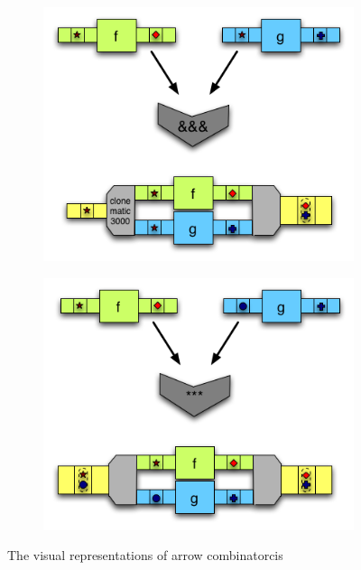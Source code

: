 \begin{figure}
  \begin{subfigure}[b]{0.475\textwidth}   
      \centering 
      \includegraphics[width=\textwidth]{background/image/ArrowsConveyors_ampersand2.png}
      \label{fig:mean and std of net34}
  \end{subfigure}
  \quad
  \begin{subfigure}[b]{0.475\textwidth}   
      \centering 
      \includegraphics[width=\textwidth]{background/image/ArrowsConveyors_star2.png}
      \label{fig:mean and std of net44}
  \end{subfigure}
  \caption
  {\small The visual representations of arrow combinatorcis\cite{HaskellUnderstandingArrows}}
  \label{b:ar:p1}
\end{figure}

